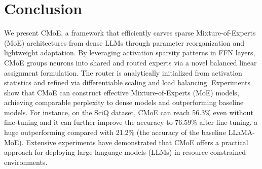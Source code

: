 \section{Conclusion}
We present CMoE, a framework that efficiently carves sparse Mixture-of-Experts (MoE) architectures from dense LLMs through parameter reorganization and lightweight adaptation. 
By leveraging activation sparsity patterns in FFN layers, CMoE groups neurons into shared and routed experts via a novel balanced linear assignment formulation. 
The router is analytically initialized from activation statistics and refined via differentiable scaling and load balancing.
Experiments show that CMoE can construct effective Mixture-of-Experts (MoE) models, achieving comparable perplexity to dense models and outperforming baseline models. For instance, on the SciQ dataset, CMoE can reach 56.3\% even without fine-tuning and it can further improve the accuracy to 76.59\% after fine-tuning, a huge outperforming compared with 21.2\% (the accuracy of the baseline LLaMA-MoE).
Extensive experiments have demonstrated that CMoE offers a practical approach for deploying large language models (LLMs) in resource-constrained environments.
